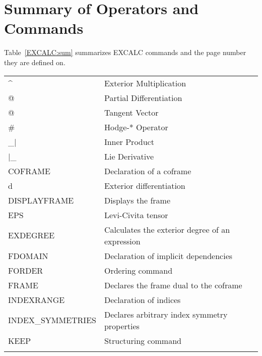 \section{Summary of Operators and Commands}
Table~\ref{EXCALC:sum} summarizes EXCALC commands and the page number they are
defined on.

\begin{table}
\begin{tabular}{l l r}
\index{"\^{} ! exterior multiplication} \index{wedge}
\^{ }  &  Exterior Multiplication & \pageref{wedge} \\
\index{"@ ! partial differentiation}
@  & Partial Differentiation & \pageref{at}  \\
\index{"@ ! tangent vector}
@  & Tangent Vector  & \pageref{at1}  \\
\index{"\# ! Hodge-* operator}
\#  & Hodge-* Operator & \pageref{hodge} \\
\index{\_$\mid$ operator}
\_$|$  & Inner Product  & \pageref{innerp} \\
\index{$\mid$\_ operator}
$|$\_  & Lie Derivative  & \pageref{lie}  \\
\index{COFRAME command}
COFRAME & Declaration of a coframe & \pageref{COFRAME} \\
\index{d ! exterior differentiation}
d &  Exterior differentiation & \pageref{d} \\
\index{DISPLAYFRAME command}
DISPLAYFRAME & Displays the frame & \pageref{DISPLAYFRAME}\\
\index{EPS ! Levi-Civita tensor}
EPS & Levi-Civita tensor  & \pageref{EPS}  \\
\index{EXDEGREE}
EXDEGREE & Calculates the exterior degree of an expression & \pageref{EXDEGREE}  \\
\index{FDOMAIN command}
FDOMAIN & Declaration of implicit dependencies &\pageref{FDOMAIN} \\
\index{FORDER command}
FORDER & Ordering command  & \pageref{FORDER} \\
\index{FRAME command}
FRAME & Declares the frame dual to the coframe & \pageref{FRAME} \\
\index{INDEXRANGE command}
INDEXRANGE & Declaration of indices & \pageref{INDEXRANGE} \\
\index{INDEX\_SYMMETRIES command}
INDEX\_SYMMETRIES & Declares arbitrary index symmetry properties  & \pageref{INDEXSYMMETRIES} \\
\index{KEEP command}
KEEP & Structuring command  & \pageref{KEEP} \\
\index{METRIC command}

\end{tabular}
\end{table}
